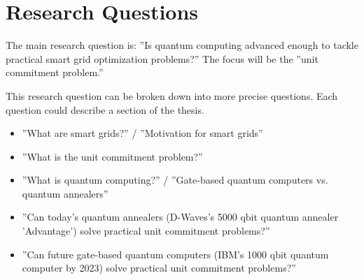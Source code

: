\section{Research Questions}

The main research question is:
''Is quantum computing advanced enough to tackle practical
smart grid optimization problems?''
The focus will be the ''unit commitment problem.''

This research question can be broken down into more precise questions.
Each question could describe a section of the thesis.
\begin{itemize}
  \item ''What are smart grids?'' / ''Motivation for smart grids''
  \item ''What is the unit commitment problem?''
  \item ''What is quantum computing?''
    / ''Gate-based quantum computers vs. quantum annealers''
  \item ''Can today's quantum annealers (D-Waves's 5000 qbit quantum annealer 'Advantage') solve practical unit commitment problems?''
  \item ''Can future gate-based quantum computers (IBM's 1000 qbit quantum computer by 2023) solve practical unit commitment problems?''
\end{itemize}